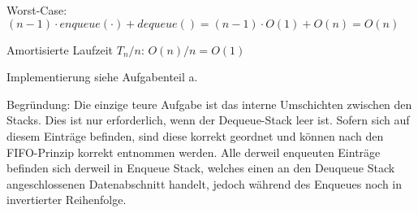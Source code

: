 \documentclass{article}
\begin{document}
\begin{enumerate}[\bfseries1.]
\begin{enumerate}
                Worst-Case: $ (n-1) \cdot enqueue(\cdot) + dequeue() 
                = (n-1) \cdot O(1) + O(n) = O(n) $
                
                Amortisierte Laufzeit $T_n/n$: $O(n)/n = O(1)$
                
                Implementierung siehe Aufgabenteil a.
                
                Begründung: Die einzige teure Aufgabe ist das interne
                Umschichten zwischen den Stacks. Dies ist nur erforderlich, wenn 
                der Dequeue-Stack leer ist. Sofern sich auf diesem Einträge
                befinden, sind diese korrekt geordnet und können nach den
                FIFO-Prinzip korrekt entnommen werden. Alle derweil enqueuten
                Einträge befinden sich derweil in Enqueue Stack, welches einen
                an den Deuqueue Stack angeschlossenen Datenabschnitt handelt,
                jedoch während des Enqueues noch in invertierter Reihenfolge.
            
        \end{enumerate}
    \end{enumerate}
\end{document}

